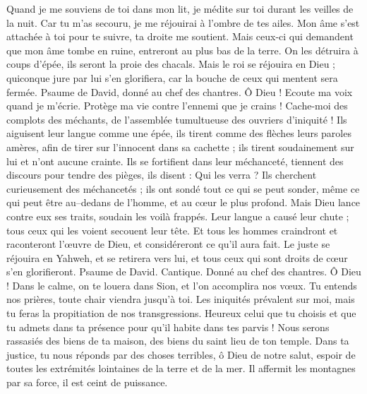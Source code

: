 \begin{multicols}{2}
Quand je me souviens de toi dans mon lit, je médite sur toi durant les veilles de la nuit.
Car tu m'as secouru, je me réjouirai à l'ombre de tes ailes.
Mon âme s'est attachée à toi pour te suivre, ta droite me soutient.
Mais ceux-ci qui demandent que mon âme tombe en ruine, entreront au plus bas de la terre.
On les détruira à coups d'épée, ils seront la proie des chacals.
Mais le roi se réjouira en Dieu ; quiconque jure par lui s'en glorifiera, car la bouche de ceux qui mentent sera fermée.
\VerseOne{}Psaume de David, donné au chef des chantres.
Ô Dieu ! Ecoute ma voix quand je m'écrie. Protège ma vie contre l'ennemi que je crains !
Cache-moi des complots des méchants, de l'assemblée tumultueuse des ouvriers d'iniquité !
Ils aiguisent leur langue comme une épée, ils tirent comme des flèches leurs paroles amères,
afin de tirer sur l'innocent dans sa cachette ; ils tirent soudainement sur lui et n'ont aucune crainte.
Ils se fortifient dans leur méchanceté, tiennent des discours pour tendre des pièges, ils disent : Qui les verra ?
Ils cherchent curieusement des méchancetés ; ils ont sondé tout ce qui se peut sonder, même ce qui peut être au–dedans de l'homme, et au cœur le plus profond.
Mais Dieu lance contre eux ses traits, soudain les voilà frappés.
Leur langue a causé leur chute ; tous ceux qui les voient secouent leur tête.
Et tous les hommes craindront et raconteront l'œuvre de Dieu, et considéreront ce qu'il aura fait.
Le juste se réjouira en Yahweh, et se retirera vers lui, et tous ceux qui sont droits de cœur s'en glorifieront.
\VerseOne{}Psaume de David. Cantique. Donné au chef des chantres.
Ô Dieu ! Dans le calme, on te louera dans Sion, et l'on accomplira nos vœux.
Tu entends nos prières, toute chair viendra jusqu'à toi.
Les iniquités prévalent sur moi, mais tu feras la propitiation de nos transgressions.
Heureux celui que tu choisis et que tu admets dans ta présence pour qu'il habite dans tes parvis ! Nous serons rassasiés des biens de ta maison, des biens du saint lieu de ton temple.
Dans ta justice, tu nous réponds par des choses terribles, ô Dieu de notre salut, espoir de toutes les extrémités lointaines de la terre et de la mer.
Il affermit les montagnes par sa force, il est ceint de puissance.

\end{multicols}

